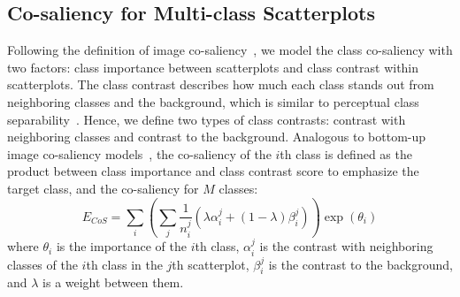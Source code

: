 \subsection{Co-saliency for Multi-class Scatterplots }
Following the definition of image co-saliency~\cite{Jacobs10}, we model the class co-saliency with two factors: class importance between scatterplots and class contrast within scatterplots.  The class contrast describes how much each class stands out from neighboring classes and the background, which is similar to perceptual class separability~\cite{Aupetit02,Wang2018}. Hence, we define two types of class contrasts: contrast with neighboring classes and contrast to the background.
Analogous to bottom-up image co-saliency models~\cite{Jacobs10,Fu13}, the co-saliency of the $i$th class is defined as the product between class importance and  class contrast score to emphasize the target class, and the co-saliency for $M$ classes:
\begin{equation}
E_{CoS} = \sum_i    \left(\sum_j \frac{1}{n^j_i}(\lambda \alpha^j_i + (1-\lambda) \beta^j_i) \right)  \exp(\theta_i)
	\label{eq:cosaliency}
\end{equation}
where $\theta_i$ is the importance of the $i$th class, $\alpha^j_i$ is the contrast with neighboring classes of the $i$th class in the $j$th scatterplot, $\beta^j_i$  is the contrast to the background, and $\lambda$ is a weight between them. 

